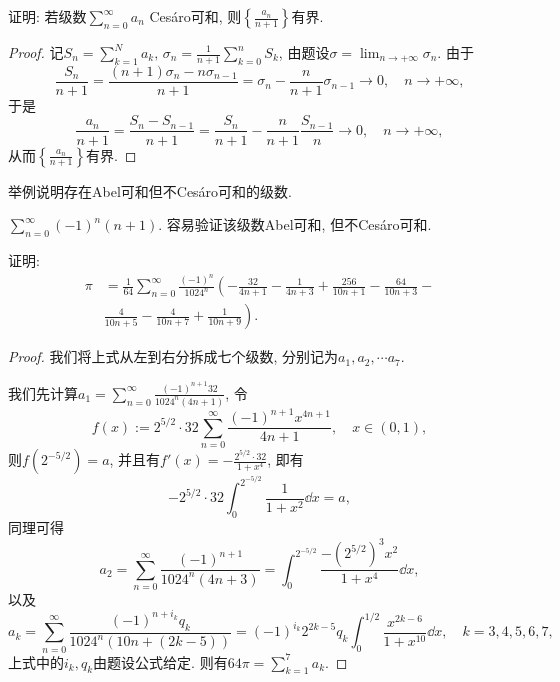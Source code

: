 \begin{quiza}
\woe 证明: 若级数\(\sum_{n=0}^{\infty}a_n\) Ces\'{a}ro可和, 则\(\left\lbrace\frac{a_n}{n+1}\right\rbrace \)有界.
\begin{proof}
记\(S_n=\sum_{k=1}^{N}a_k,\,\sigma_n=\frac{1}{n+1}\sum_{k=0}^{n}S_k\), 由题设\(\sigma=\lim_{n\rightarrow+\infty}\sigma_n\).  由于\[\frac{S_{n}}{n+1}=\frac{(n+1)\sigma_n-n\sigma_{n-1}}{n+1}=\sigma_n-\frac{n}{n+1}\sigma_{n-1}\rightarrow 0,\quad n\rightarrow+\infty,\]于是\[\frac{a_n}{n+1}=\frac{S_n-S_{n-1}}{n+1}=\frac{S_n}{n+1}-\frac{n}{n+1}\frac{S_{n-1}}{n}\rightarrow 0,\quad n\rightarrow+\infty,\]从而\(\left\lbrace\frac{a_n}{n+1}\right\rbrace \)有界.
\end{proof}
\woe 举例说明存在Abel可和但不Ces\'{a}ro可和的级数.
\begin{solution}
\(\sum_{n=0}^{\infty}(-1)^n(n+1)\). 容易验证该级数Abel可和, 但不Ces\'{a}ro可和.
\end{solution}
\woe 证明:\[\begin{split}
\pi&=\frac{1}{64}\sum_{n=0}^{\infty}\frac{(-1)^n}{1024^n}\left(-\frac{32}{4n+1}-\frac{1}{4n+3}+\frac{256}{10n+1}-\frac{64}{10n+3}-\right.\\&\left.\frac{4}{10n+5}-\frac{4}{10n+7}+\frac{1}{10n+9}\right).\end{split}\]
\begin{proof}
	我们将上式从左到右分拆成七个级数, 分别记为\(a_1,a_2,\cdots a_7\).
	
	我们先计算\(a_1=\sum_{n=0}^{\infty}\frac{(-1)^{n+1}32}{1024^n(4n+1)}\), 令\[f(x):=2^{5/2}\cdot 32\sum_{n=0}^{\infty}\frac{(-1)^{n+1}x^{4n+1}}{4n+1},\quad x\in(0,1),\]则\(f\left(2^{-5/2}\right)=a\), 并且有\(f'(x)=-\frac{2^{5/2}\cdot 32}{1+x^4}\), 即有\[-2^{5/2}\cdot 32\int_{0}^{2^{-5/2}}\frac{1}{1+x^2}\dd x=a,\]同理可得\[a_2=\sum_{n=0}^{\infty}\frac{(-1)^{n+1}}{1024^n(4n+3)}=\int_{0}^{2^{-5/2}}\frac{-(2^{5/2})^3x^2}{1+x^4}\dd x,\]
	以及\[a_k=\sum_{n=0}^{\infty}\frac{(-1)^{n+i_k}q_k}{1024^n\left(10n+(2k-5)\right)}=(-1)^{i_k}2^{2k-5}q_k\int_{0}^{1/2}\frac{x^{2k-6}}{1+x^{10}}\dd x,\quad k=3,4,5,6,7,\]上式中的\(i_k,q_k\)由题设公式给定. 则有\(64\pi=\sum_{k=1}^{7}a_k.\)
\end{proof}
\end{quiza}
